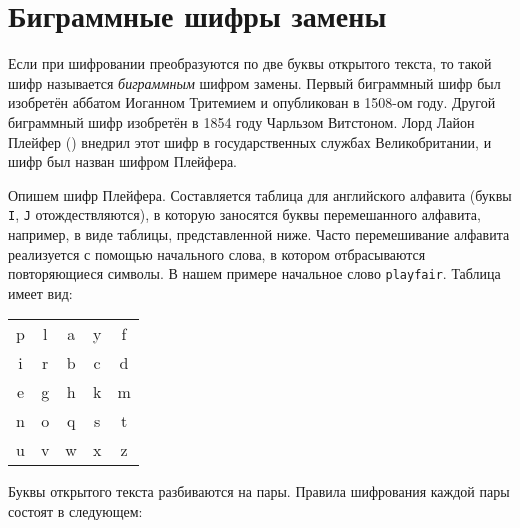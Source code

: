 \section{Биграммные шифры замены}

Если при шифровании преобразуются по две буквы открытого текста, то такой шифр называется \emph{биграммным} шифром замены. Первый биграммный шифр был изобретён аббатом Иоганном Тритемием и опубликован в 1508-ом году. Другой биграммный шифр изобретён в 1854 году Чарльзом Витстоном. Лорд Лайон Плейфер () внедрил этот шифр в государственных службах Великобритании, и шифр был назван шифром Плейфера.

Опишем шифр Плейфера. Составляется таблица для английского алфавита (буквы \texttt{I}, \texttt{J} отождествляются), в которую заносятся буквы перемешанного алфавита, например, в виде таблицы, представленной ниже. Часто перемешивание алфавита реализуется с помощью начального слова, в котором отбрасываются повторяющиеся символы. В нашем примере начальное слово \texttt{playfair}. Таблица имеет вид:

\begin{center}
    \begin{tabular}{ccccc}
        p & l & a & y & f  \\
        i & r & b & c & d  \\
        e & g & h & k & m  \\
        n & o & q & s & t  \\
        u & v & w & x & z  \\
    \end{tabular}
\end{center}

Буквы открытого текста разбиваются на пары. Правила шифрования каждой пары состоят в следующем:

